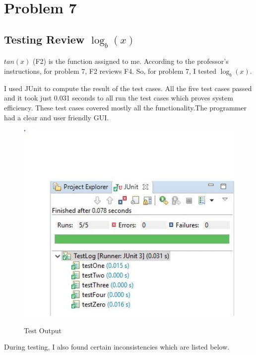 \documentclass{article}
\begin{document}
 


\pagebreak
\chapter{Problem 7}
\section{Testing Review $\log_{b} (x)$}
$tan(x)$ (F2) is the function assigned to me. According to the professor's instructions, for problem 7, F2 reviews F4. So, for problem 7, I tested $\log_{b} (x)$.
\begin{flushleft}
 I used JUnit to compute the result of the test cases. All the five test cases passed and it took just 0.031 seconds to all run the test cases which proves system efficiency. These test cases covered mostly all the functionality.The programmer had a clear and user friendly GUI.
 \end{flushleft}

\begin{figure}[h!]
  \centering
  \includegraphics[width=20cm,height=10cm,keepaspectratio]{report.jpg}\\[1cm] 
  \caption{Test Output}
\end{figure}

 During testing, I also found certain inconsistencies which are listed below.
\end{document}
